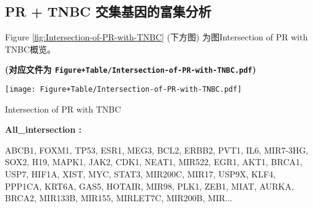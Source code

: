 \documentclass[
]{article}
\begin{document}
\begin{center}\vspace{1.5cm}\end{center}

\hypertarget{pr-tnbc-ux4ea4ux96c6ux57faux56e0ux7684ux5bccux96c6ux5206ux6790}{%
\subsection{PR + TNBC 交集基因的富集分析}\label{pr-tnbc-ux4ea4ux96c6ux57faux56e0ux7684ux5bccux96c6ux5206ux6790}}

\begin{center}\vspace{1.5cm}\end{center}

Figure \ref{fig:Intersection-of-PR-with-TNBC} (下方图) 为图Intersection of PR with TNBC概览。

\textbf{(对应文件为 \texttt{Figure+Table/Intersection-of-PR-with-TNBC.pdf})}

\def\@captype{figure}
\begin{center}
\texttt{[image: Figure+Table/Intersection-of-PR-with-TNBC.pdf]}
\caption{Intersection of PR with TNBC}\label{fig:Intersection-of-PR-with-TNBC}
\end{center}

\begin{center}\vspace{1.5cm}\end{center}\begin{center}\begin{tcolorbox}[colback=gray!10, colframe=gray!50, width=0.9\linewidth, arc=1mm, boxrule=0.5pt]
\textbf{
All\_intersection
:}

\vspace{0.5em}

    ABCB1, FOXM1, TP53, ESR1, MEG3, BCL2, ERBB2, PVT1, IL6,
MIR7-3HG, SOX2, H19, MAPK1, JAK2, CDK1, NEAT1, MIR522,
EGR1, AKT1, BRCA1, USP7, HIF1A, XIST, MYC, STAT3, MIR200C,
MIR17, USP9X, KLF4, PPP1CA, KRT6A, GAS5, HOTAIR, MIR98,
PLK1, ZEB1, MIAT, AURKA, BRCA2, MIR133B, MIR155, MIRLET7C,
MIR200B, MIR...

\vspace{2em}
\end{tcolorbox}
\end{center}
\end{document}
